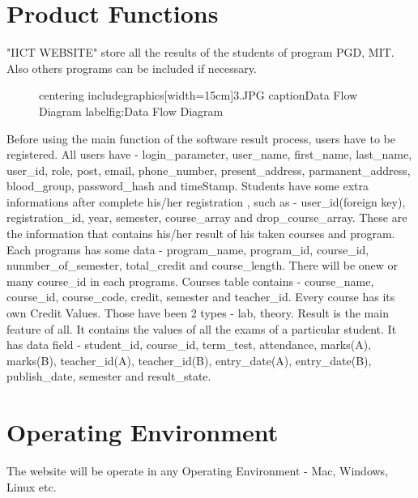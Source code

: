 \documentclass{scrreprt}
\begin{document}
    \section{Product Functions}
    "IICT WEBSITE" store all the results of the students of program PGD, MIT. Also others programs can be included if necessary.
    \begin{figure}[h!]
        centering
        includegraphics[width=15cm]{3.JPG}
        caption{Data Flow Diagram}
        label{fig:Data Flow Diagram}
    \end{figure}
    Before using the main function of the software result process, users have to be registered. 
    \newline
    All users have - login_parameter, user_name, first_name, last_name, user_id, role, post, email, phone_number, present_address, parmanent_address, blood_group, password_hash and timeStamp.
    \newline
    Students have some extra informations after complete his/her registration , such as - user_id(foreign key), registration_id, year, semester, course_array and drop_course_array. These are the information that contains his/her result of his taken courses and program.
    \newline
    Each programs has some data - program_name, program_id, course_id, nunmber_of_semester, total_credit and course_length. There will be onew or many course_id in each programs.
    \newline
    Courses table contains - course_name, course_id, course_code, credit, semester and teacher_id.
    \newline
    Every course has its own Credit Values. Those have been 2 types - lab, theory.
    \newline
    Result is the main feature of all. It contains the values of all the exams of a particular student. It has data field - student_id, course_id, term_test, attendance, marks(A), marks(B), teacher_id(A), teacher_id(B), entry_date(A), entry_date(B), publish_date, semester	and result_state.
    
    \section{Operating Environment}
    The website will be operate in any Operating Environment - Mac, Windows, Linux etc. 
\end{document}
